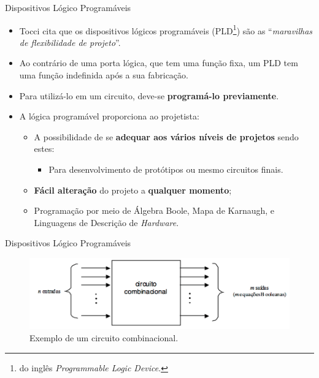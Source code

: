 	\begin{frame}{Dispositivos Lógico Programáveis}
		\begin{itemize}
			\setlength\itemsep{1.4em}

			\item Tocci \cite{Tocci2003} cita que os dispositivos lógicos programáveis (PLD\footnote{do inglês \textit{Programmable Logic Device}.}) são as ``\textit{maravilhas de flexibilidade de projeto}''.

			\item Ao contrário de uma porta lógica, que tem uma função fixa, um PLD tem uma função indefinida após a sua fabricação.

			\item Para utilizá-lo em um circuito, deve-se \textbf{programá-lo previamente}.

			\item A lógica programável proporciona ao projetista:
			\begin{itemize}
				\setlength\itemsep{0.5em}
				\item A possibilidade de se \textbf{adequar aos vários níveis de projetos} sendo estes:
				\begin{itemize}
					\item Para desenvolvimento de protótipos ou mesmo circuitos finais.
				\end{itemize}

				\item \textbf{Fácil alteração} do projeto a \textbf{qualquer momento};

				\item Programação por meio de Álgebra Boole, Mapa de Karnaugh, e Linguagens de Descrição de \textit{Hardware}.
			\end{itemize}
		\end{itemize}
	\end{frame}

	\begin{frame}{Dispositivos Lógico Programáveis}
		\begin{figure}[H]
			\centering
			\includegraphics[width=1\textwidth]{img/fpga/geral1.png}
			\caption{Exemplo de um circuito combinacional.}
		\end{figure}
	\end{frame}

